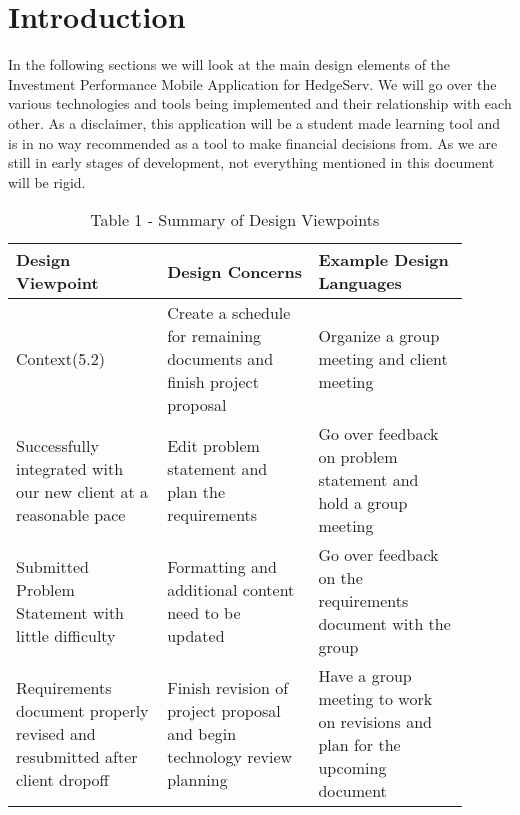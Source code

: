 \documentclass[onecolumn, draftclsnofoot,10pt, compsoc]{IEEEtran}
\begin{document}
\section{Introduction}
    In the following sections we will look at the main design elements of the Investment Performance Mobile
    Application for HedgeServ. We will go over the various technologies and tools being implemented and their
    relationship with each other. As a disclaimer, this application will be a student made learning tool and is in
    no way recommended as a tool  to make financial decisions from. As we are still in early stages of development,
    not everything mentioned in this document will be rigid. 
    
    
\begin{table}
                        \caption{Table 1 - Summary of Design Viewpoints}
                        \begin{center}
                                \begin{tabular}{| p{0.3\linewidth} | p{0.3\linewidth} | p{0.3\linewidth} | }
                                        \hline
                                         \textbf{Design Viewpoint} & \textbf{Design Concerns} & \textbf{Example Design Languages} \\ [0.5ex]
                                        \hline
                                        Context(5.2)  & Create a schedule for remaining documents and finish project proposal & Organize a group meeting and client meeting  \\
                                        \hline
                                         Successfully integrated with our new client at a reasonable pace & Edit problem statement and plan the requirements & Go over feedback on problem statement and hold a group meeting \\
                                        \hline
                                         Submitted Problem Statement with little difficulty & Formatting and additional content need to be updated & Go over feedback on the requirements document with the group \\
                                        \hline
                                        Requirements document properly revised and resubmitted after client dropoff & Finish revision of project proposal and begin technology review planning & Have a group meeting to work on revisions and plan for the upcoming document\\

\end{tabular}
\end{center}
\end{table}
\end{document}

